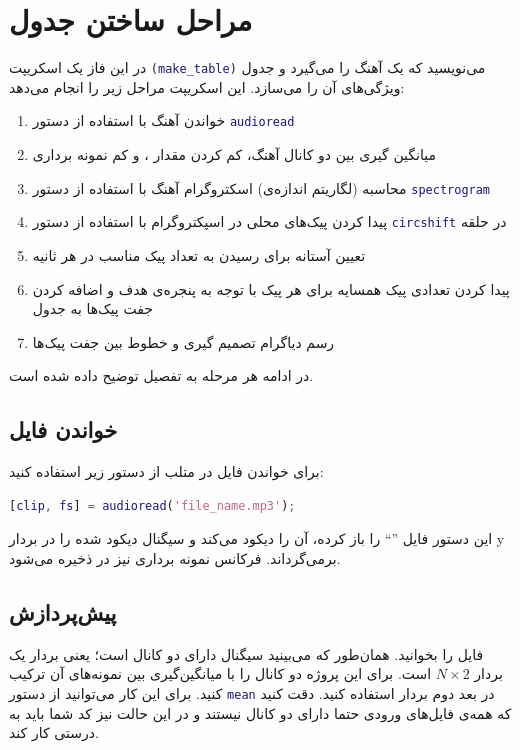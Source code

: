 \documentclass{utsignal}
\begin{document}
	\section{مراحل ساختن جدول}
	در این فاز یک اسکریپت \lstinline[language=Matlab]{(make_table)} می‌نویسید که یک آهنگ را می‌گیرد و جدول ویژگی‌های آن را می‌سازد. این اسکریپت مراحل زیر را انجام می‌دهد:
	\begin{enumerate}
		\item خواندن آهنگ با استفاده از دستور \lstinline[language=Matlab]{audioread}
		\item میانگین گیری بین دو کانال آهنگ، کم کردن مقدار ، و کم نمونه برداری
		\item محاسبه (لگاریتم اندازه‌ی) اسکتروگرام آهنگ با استفاده از دستور \lstinline[language=Matlab]{spectrogram}
		\item پیدا کردن پیک‌های محلی در اسپکتروگرام با استفاده از دستور \lstinline[language=Matlab]{circshift} در حلقه
		\item تعیین آستانه برای رسیدن به تعداد پیک مناسب در هر ثانیه
		\item پیدا کردن تعدادی پیک همسایه برای هر پیک با توجه به پنجره‌ی هدف و اضافه کردن جفت پیک‌ها به جدول
		\item رسم دیاگرام تصمیم گیری و خطوط بین جفت پیک‌ها
	\end{enumerate}
	در ادامه هر مرحله به تفصیل توضیح داده شده است.
	
	\subsection{خواندن فایل }
	برای خواندن فایل  در متلب از دستور زیر استفاده کنید:
	\begin{latin}
		\begin{lstlisting}[language=Matlab]
	[clip, fs] = audioread('file_name.mp3');\end{lstlisting}
	\end{latin}
	این دستور فایل ''`` را باز کرده، آن را دیکود می‌کند و سیگنال دیکود شده را در بردار y برمی‌گرداند. فرکانس نمونه برداری نیز در  ذخیره می‌شود.
	\subsection{پیش‌پردازش}
	فایل  را بخوانید. همان‌طور که می‌بینید سیگنال دارای دو کانال است؛ یعنی بردار  یک بردار $N\times 2$ است. برای این پروژه دو کانال را با میانگین‌گیری بین نمونه‌های آن ترکیب کنید. برای این کار می‌توانید از دستور \lstinline[language=Matlab]{mean} در بعد دوم بردار  استفاده کنید. دقت کنید که همه‌ی فایل‌های ورودی حتما دارای دو کانال نیستند و در این حالت نیز کد شما باید به درستی کار کند.
	
\end{document}

